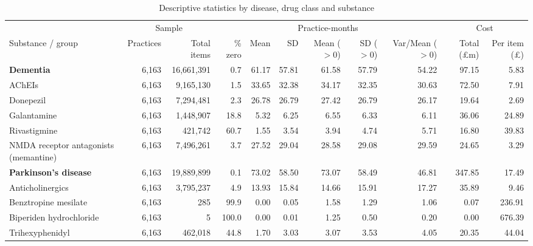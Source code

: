 \begin{table}[htbp]
\centering
\caption{Descriptive statistics by disease, drug class and substance}
\label{tab:descriptives}
\footnotesize
\begin{adjustbox}{max width=\textwidth}
\begin{tabular}{lrrrrrrrrrr}
\toprule
 & \multicolumn{2}{c}{Sample} & \multicolumn{6}{c}{Practice-months} & \multicolumn{2}{c}{Cost} \\
\cmidrule(lr){2-3}\cmidrule(lr){4-9}\cmidrule(lr){10-11}
Substance / group & Practices & Total items & \% zero & Mean & SD & Mean ($>0$) & SD ($>0$) & Var/Mean ($>0$) & Total (\pounds m) & Per item (\pounds) \\
\midrule
\textbf{Dementia} & 6,163 & 16,661,391 & 0.7 & 61.17 & 57.81 & 61.58 & 57.79 & 54.22 & 97.15 & 5.83 \\
\hspace{1em}AChEIs & 6,163 & 9,165,130 & 1.5 & 33.65 & 32.38 & 34.17 & 32.35 & 30.63 & 72.50 & 7.91 \\
\hspace{2em}Donepezil & 6,163 & 7,294,481 & 2.3 & 26.78 & 26.79 & 27.42 & 26.79 & 26.17 & 19.64 & 2.69 \\
\hspace{2em}Galantamine & 6,163 & 1,448,907 & 18.8 & 5.32 & 6.25 & 6.55 & 6.33 & 6.11 & 36.06 & 24.89 \\
\hspace{2em}Rivastigmine & 6,163 & 421,742 & 60.7 & 1.55 & 3.54 & 3.94 & 4.74 & 5.71 & 16.80 & 39.83 \\
\hspace{1em}NMDA receptor antagonists (memantine) & 6,163 & 7,496,261 & 3.7 & 27.52 & 29.04 & 28.58 & 29.08 & 29.59 & 24.65 & 3.29 \\
\midrule
\textbf{Parkinson's disease} & 6,163 & 19,889,899 & 0.1 & 73.02 & 58.50 & 73.07 & 58.49 & 46.81 & 347.85 & 17.49 \\
\hspace{1em}Anticholinergics & 6,163 & 3,795,237 & 4.9 & 13.93 & 15.84 & 14.66 & 15.91 & 17.27 & 35.89 & 9.46 \\
\hspace{2em}Benztropine mesilate & 6,163 & 285 & 99.9 & 0.00 & 0.05 & 1.58 & 1.29 & 1.06 & 0.07 & 236.91 \\
\hspace{2em}Biperiden hydrochloride & 6,163 & 5 & 100.0 & 0.00 & 0.01 & 1.25 & 0.50 & 0.20 & 0.00 & 676.39 \\
\hspace{2em}Trihexyphenidyl & 6,163 & 462,018 & 44.8 & 1.70 & 3.03 & 3.07 & 3.53 & 4.05 & 20.35 & 44.04 \\

\end{tabular}
\end{adjustbox}
\end{table}
